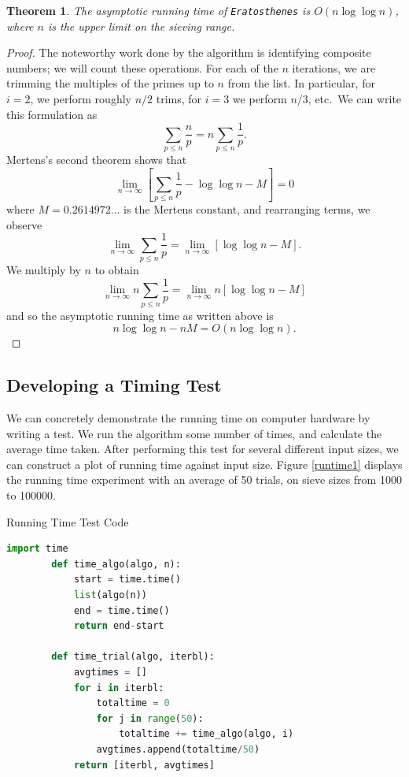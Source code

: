 \documentclass{amsart}
\newtheorem{thm}{Theorem}
\theoremstyle{definition}
\theoremstyle{case}
\begin{document}
	\begin{thm}\label{runtimethm}
		The asymptotic running time of \texttt{Eratosthenes} is $O(n\log\log n)$, where $n$ is the upper limit on the sieving range.
	\end{thm}
	\begin{proof}
		The noteworthy work done by the algorithm is identifying composite numbers; we will count these operations. For each of the $n$ iterations, we are trimming the multiples of the primes up to $n$ from the list. In particular, for $i=2$, we perform roughly $n/2$ trims, for $i=3$ we perform $n/3$, etc.\ We can write this formulation as
		$$ \sum_{p\leq n} \frac{n}{p} = n \sum_{p \leq n} \frac{1}{p} . $$
		Mertens's second theorem shows that
		$$ \lim\limits_{n\rightarrow\infty} \left[ \sum_{p \leq n} \frac{1}{p} - \log\log n - M \right] = 0 $$
		where $M=0.2614972\dots$ is the Mertens constant, and rearranging terms, we observe
		$$ \lim\limits_{n\rightarrow\infty} \sum_{p \leq n} \frac{1}{p} = \lim\limits_{n\rightarrow\infty} \left[ \log\log n - M \right] . $$
		We multiply by $n$ to obtain
		$$ \lim\limits_{n\rightarrow\infty} n \sum_{p \leq n} \frac{1}{p} = \lim\limits_{n\rightarrow\infty} n \left[ \log\log n - M \right] $$
		and so the asymptotic running time as written above is
		$$ n \log \log n - nM = O(n\log\log n). $$
	\end{proof}
	
	\subsection{Developing a Timing Test}
	
	We can concretely demonstrate the running time on computer hardware by writing a test. We run the algorithm some number of times, and calculate the average time taken. After performing this test for several different input sizes, we can construct a plot of running time against input size. Figure \ref{runtime1} displays the running time experiment with an average of 50 trials, on sieve sizes from 1000 to 100000.
	
	\begin{Algorithm}[H]\caption{Running Time Test Code}
		\begin{lstlisting}[language=Python]
        import time
        def time_algo(algo, n):
            start = time.time()
            list(algo(n))
            end = time.time()
            return end-start
        
        def time_trial(algo, iterbl):
            avgtimes = []
            for i in iterbl:
                totaltime = 0
                for j in range(50):
                    totaltime += time_algo(algo, i)
                avgtimes.append(totaltime/50)
            return [iterbl, avgtimes]
        \end{lstlisting}
	\end{Algorithm}
	
\end{document}
